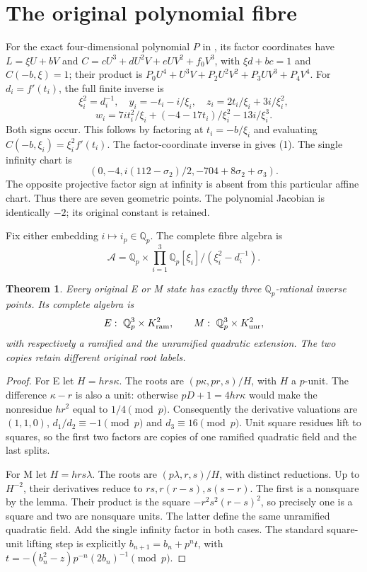 \documentclass[11pt,reqno]{amsart}
\newtheorem{theorem}{Theorem}\newtheorem{lemma}{Lemma}
\begin{document}
\section{The original polynomial fibre}
For the exact four-dimensional polynomial $P$ in \cite[GF1]{Zeta}, its factor
coordinates have $L=\xi U+bV$ and $C=cU^3+dU^2V+eUV^2+f_0V^3$, with
$\xi d+bc=1$ and $C(-b,\xi)=1$; their product is
$P_0U^4+U^3V+P_2U^2V^2+P_3UV^3+P_4V^4$.
For $d_i=f'(t_i)$, the full finite inverse is
\[
 \xi_i^2=d_i^{-1},\quad y_i=-t_i-i/\xi_i,\quad
 z_i=2t_i/\xi_i+3i/\xi_i^2,
\]
\[
 w_i=7it_i^2/\xi_i+(-4-17t_i)/\xi_i^2-13i/\xi_i^3.
                                                               \tag{1}
\]
Both signs occur. This follows by factoring at $t_i=-b/\xi_i$ and evaluating
$C(-b,\xi_i)=\xi_i^2f'(t_i)$. The factor-coordinate inverse in
\cite[GF5--7]{Zeta} gives (1). The single infinity chart is
\[
 (0,-4,i(112-\sigma_2)/2,-704+8\sigma_2+\sigma_3).       \tag{2}
\]
The opposite projective factor sign at infinity is absent from this particular
affine chart. Thus there are seven geometric points. The polynomial Jacobian
is identically $-2$; its original constant is retained.

Fix either embedding $i\mapsto i_p\in\mathbb Q_p$. The complete fibre algebra is
\[
 \mathcal A=\mathbb Q_p\times
 \prod_{i=1}^3\mathbb Q_p[\xi_i]/(\xi_i^2-d_i^{-1}).       \tag{3}
\]

\begin{theorem}
Every original E or M state has exactly three $\mathbb Q_p$-rational inverse
points. Its complete algebra is
\[
 E:\ \mathbb Q_p^3\times K_{\rm ram}^2,
 \qquad M:\ \mathbb Q_p^3\times K_{\rm unr}^2,
\]
with respectively a ramified and the unramified quadratic extension. The two
copies retain different original root labels.
\end{theorem}
\begin{proof}
For E let $H=hrs\kappa$. The roots are $(p\kappa,pr,s)/H$, with $H$ a $p$-unit.
The difference $\kappa-r$ is also a unit: otherwise $pD+1=4hr\kappa$ would
make the nonresidue $hr^2$ equal to $1/4\pmod p$.
Consequently the derivative valuations are $(1,1,0)$,
$d_1/d_2\equiv-1\pmod p$ and $d_3\equiv16\pmod p$.
Unit square residues lift to squares, so the first two factors are copies of one
ramified quadratic field and the last splits.

For M let $H=hrs\lambda$. The roots are $(p\lambda,r,s)/H$, with distinct
reductions. Up to $H^{-2}$, their derivatives reduce to
$rs,r(r-s),s(s-r)$. The first is a nonsquare by the lemma. Their product is the
square $-r^2s^2(r-s)^2$, so precisely one is a square and two are nonsquare units.
The latter define the same unramified quadratic field. Add the single infinity
factor in both cases. The standard square-unit lifting step is explicitly
$b_{n+1}=b_n+p^n t$, with
$t=-(b_n^2-z)p^{-n}(2b_n)^{-1}\pmod p$.
\end{proof}
\end{document}
